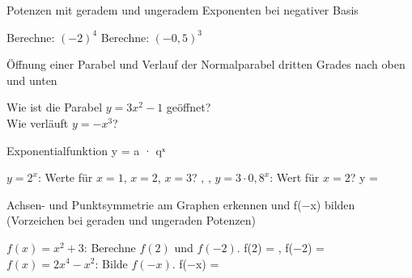 \setcounter{aufgabe}{0}

\begin{aufgabe}{Potenzen mit geradem und ungeradem Exponenten bei negativer Basis}
\begin{teile}
\teil Berechne: $(-2)^4$ \leerfeld
\teil Berechne: $(-0{,}5)^3$ \leerfeld
\end{teile}
\end{aufgabe}

\begin{aufgabe}{Öffnung einer Parabel und Verlauf der Normalparabel dritten Grades nach oben und unten}
\begin{teile}
\teil Wie ist die Parabel $y = 3x^2 - 1$ geöffnet?  \\ 
\teil Wie verläuft $y = -x^3$?  \\ 
\end{teile}
\end{aufgabe}

\begin{aufgabe}{Exponentialfunktion y = a · qˣ}
\begin{teile}
\teil $y = 2^x$: Werte für $x = 1$, $x = 2$, $x = 3$? \leerfeld , \leerfeld , \leerfeld
\teil $y = 3 \cdot 0{,}8^x$: Wert für $x = 2$? y = \leerfeld
\end{teile}
\end{aufgabe}

\begin{aufgabe}{Achsen- und Punktsymmetrie am Graphen erkennen und f(−x) bilden (Vorzeichen bei geraden und ungeraden Potenzen)}
\begin{teile}
\teil $f(x) = x^2 + 3$: Berechne $f(2)$ und $f(-2)$. f(2) = \leerfeld , f(−2) = \leerfeld
\teil $f(x) = 2x^4 - x^2$: Bilde $f(-x)$. f(−x) = \leerfeld
\end{teile}
\end{aufgabe}

